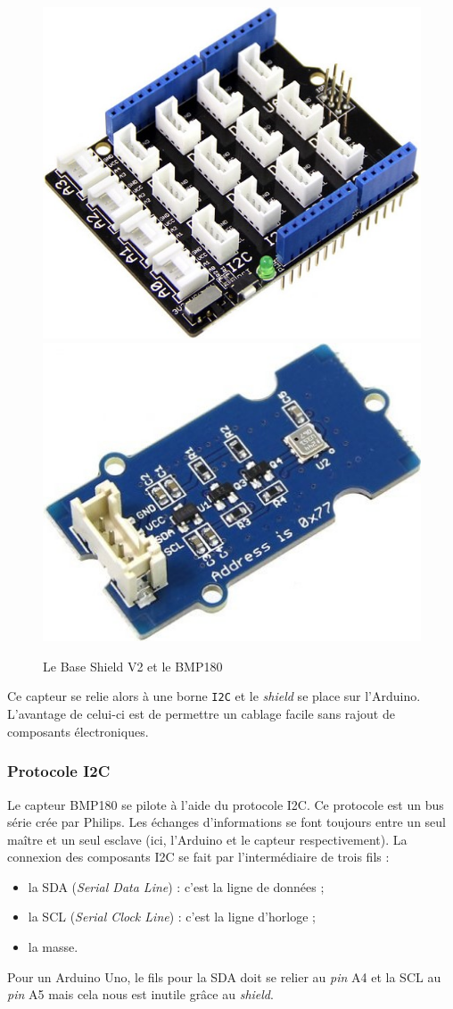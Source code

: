\begin{figure}
	\centering
	\includegraphics[width=.4\linewidth]{Images/Base_Shield}
	\hspace{.1\linewidth}
	\includegraphics[width=.4\linewidth]{Images/BMP180}
	\caption{Le Base Shield V2 et le BMP180}
\end{figure}

Ce capteur se relie alors à une borne \verb-I2C- et le \emph{shield} se place sur l'Arduino. L'avantage de celui-ci est de permettre un cablage facile sans rajout de composants électroniques.

\subsubsection{Protocole I\up 2C}

Le capteur BMP180 se pilote à l'aide du protocole I\up 2C. Ce protocole est un bus série crée par Philips. Les échanges d'informations se font toujours entre un seul maître et un seul esclave (ici, l'Arduino et le capteur respectivement). La connexion des composants I\up 2C se fait par l'intermédiaire de trois fils :
\begin{itemize}
	\item la SDA (\emph{Serial Data Line}) : c'est la ligne de données ;
	\item la SCL (\emph{Serial Clock Line}) : c'est la ligne d'horloge ;
	\item la masse.
\end{itemize}
Pour un Arduino Uno, le fils pour la SDA doit se relier au \emph{pin} A4 et la SCL au \emph{pin} A5 mais cela nous est inutile grâce au \emph{shield}.

